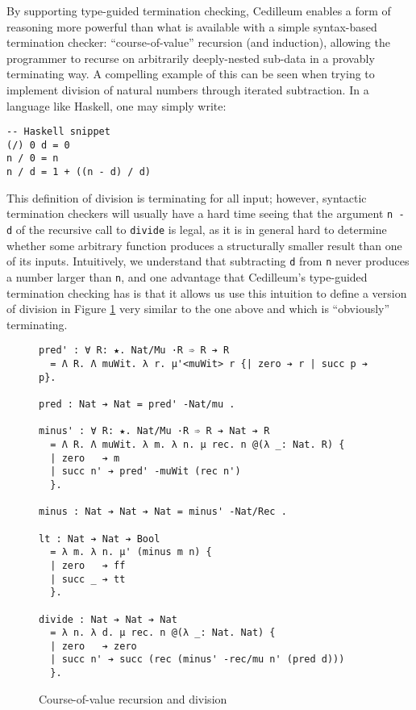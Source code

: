 \documentclass{article}
\begin{document}
By supporting type-guided termination checking, Cedilleum enables a form of
reasoning more powerful than what is available with a simple
syntax-based termination checker: ``course-of-value'' recursion (and induction),
allowing the programmer to recurse on arbitrarily deeply-nested sub-data in a
provably terminating way. A compelling example of this can be seen when trying
to implement division of natural numbers through iterated subtraction. In a
language like Haskell, one may simply write:
\begin{verbatim}
-- Haskell snippet
(/) 0 d = 0
n / 0 = n
n / d = 1 + ((n - d) / d)
\end{verbatim}
This definition of division is terminating for all input; however, syntactic
termination checkers will usually have a hard time seeing that the argument
\texttt{n - d} of the recursive call to \texttt{divide} is legal, as it is in
general hard to determine whether some arbitrary function produces a
structurally smaller result than one of its inputs. Intuitively, we understand
that subtracting \texttt{d} from \texttt{n} never produces a number larger than
\texttt{n}, and one advantage that Cedilleum's type-guided termination checking
has is that it allows us use this intuition to define a version of division in
Figure \ref{fig:ex-data-div} very similar to the one above and which is
``obviously'' terminating.

\label{sec:hist-rec}
\begin{figure}[h]
\begin{verbatim}
pred' : ∀ R: ★. Nat/Mu ·R ➾ R ➔ R
  = Λ R. Λ muWit. λ r. μ'<muWit> r {| zero ➔ r | succ p ➔ p}.

pred : Nat ➔ Nat = pred' -Nat/mu .

minus' : ∀ R: ★. Nat/Mu ·R ➾ R ➔ Nat ➔ R
  = Λ R. Λ muWit. λ m. λ n. μ rec. n @(λ _: Nat. R) {
  | zero   ➔ m
  | succ n' ➔ pred' -muWit (rec n')
  }.

minus : Nat ➔ Nat ➔ Nat = minus' -Nat/Rec .

lt : Nat ➔ Nat ➔ Bool
  = λ m. λ n. μ' (minus m n) {
  | zero   ➔ ff
  | succ _ ➔ tt
  }.

divide : Nat ➔ Nat ➔ Nat
  = λ n. λ d. μ rec. n @(λ _: Nat. Nat) {
  | zero   ➔ zero
  | succ n' ➔ succ (rec (minus' -rec/mu n' (pred d)))
  }.
\end{verbatim}
  \caption{Course-of-value recursion and division}
  \label{fig:ex-data-div}
\end{figure}
\end{document}
